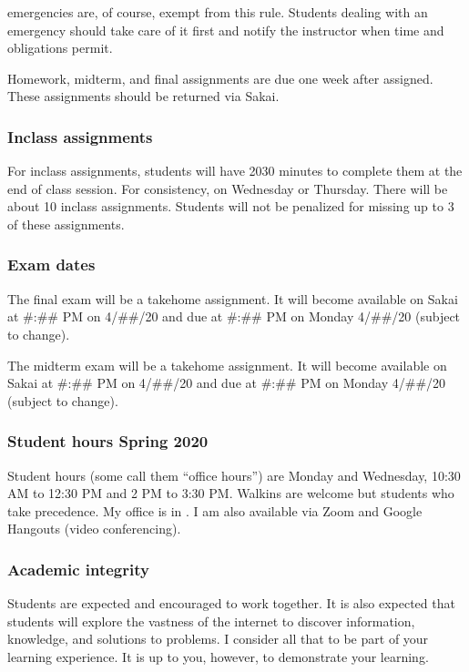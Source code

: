 \documentclass[letterpaper,10pt,english]{sphinxmanual}
\begin{document}
 emergencies are, of course, exempt from this rule. Students dealing with an emergency should take care of it first and notify the instructor when time and obligations permit.

Homework, midterm, and final assignments are due one week after assigned. These assignments should be returned via Sakai.


\subsubsection{In\sphinxhyphen{}class assignments}
\label{\detokenize{COMP170/organization:in-class-assignments}}
For in\sphinxhyphen{}class assignments, students will have 20\sphinxhyphen{}30 minutes to complete them at the end of class session. For consistency,  on Wednesday or Thursday. There will be about 10 in\sphinxhyphen{}class assignments. Students will not be penalized for missing up to 3 of these assignments.


\subsubsection{Exam dates}
\label{\detokenize{COMP170/organization:exam-dates}}
The final exam will be a take\sphinxhyphen{}home assignment. It will become available on Sakai at \#:\#\# PM on 4/\#\#/20 and due at \#:\#\# PM on Monday 4/\#\#/20 (subject to change).

The midterm exam will be a take\sphinxhyphen{}home assignment. It will become available on Sakai at \#:\#\# PM on 4/\#\#/20 and due at \#:\#\# PM on Monday 4/\#\#/20 (subject to change).


\subsubsection{Student hours \sphinxhyphen{} Spring 2020}
\label{\detokenize{COMP170/organization:student-hours-spring-2020}}
Student hours (some call them “office hours”) are Monday and Wednesday, 10:30 AM to 12:30 PM and 2 PM to 3:30 PM. Walk\sphinxhyphen{}ins are welcome but students who   take precedence. My office is in . I am also available via Zoom and Google Hangouts (video conferencing).


\subsubsection{Academic integrity}
\label{\detokenize{COMP170/organization:academic-integrity}}
Students are expected and encouraged to work together. It is also expected that students will explore the vastness of the internet to discover information, knowledge, and solutions to problems. I consider all that to be part of your learning experience. It is up to you, however, to demonstrate your learning.
\end{document}
